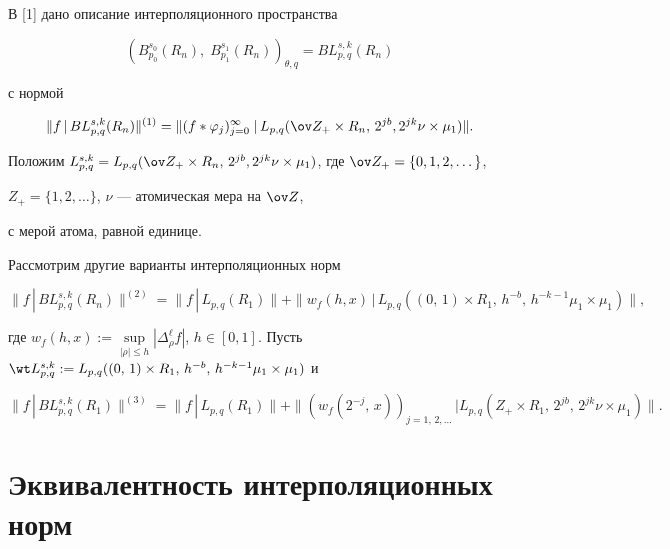 В [1] дано описание интерполяционного пространства


$$


(B^{s_0}_{p_0}(R_n),\; B^{s_1}_{p_1}(R_n))_{\theta, q} =


BL^{s,k}_{p,q}(R_n)


$$


с нормой


$$


\|f\,|\,BL^{s,k}_{p,q}(R_n)\|^{(1)} = \|(f*\varphi_j)^{\infty


}_{j=0} \;|\,L_{p,q}(\ov Z_+\times R_n,\, 2^{jb}, 2^{jk}\nu \times


\mu_1) \|.


$$


Положим $L^{s,k}_{p,q} = L_{p,q}(\ov Z_+\times R_n,\, 2^{jb},


2^{jk}\nu \times \mu_1)$, где $\ov Z_+ =\{0,1,2,\dotsc \}$,


$Z_+ =\{ 1,2,\dotsc \}$, $\nu$ --- атомическая мера на $\ov Z$,


с мерой атома, равной единице.





Рассмотрим другие варианты интерполяционных норм


$$


\|f\,|\,BL^{s,k}_{p,q}(R_n)\|^{(2)}


= \|f\,|\,L_{p,q}(R_1)\|+


\|w_f(h,x)\, |\, L_{p,q} ((0,\,1)


\times R_1,\, h^{-b},\,h^{-k-1}\mu_1\times \mu_1 )\|,


$$


где $w_f(h,x) :=\sup\limits_{|\rho |\le h} |\Delta^{\ell }_{\rho}


f|$, $h\in [0,1]$. Пусть $\wt L^{s,k}_{p,q} : = L_{p,q}


((0,\,1)\times R_1,\, h^{-b},\,h^{-k-1}\mu_1\times \mu_1)$ и


$$


\|f\,|\,BL^{s,k}_{p,q}(R_1


)\|^{(3)} = \|f\,|\,L_{p,q}(R_1)\|+


\|(w_f(2^{-j},\,x))_{j=1,\,2,\dots }\, | L_{p,q} (Z_+\times R_1,


\,2^{jb},\, 2^{jk}\nu\times \mu_1 )\|.


$$





\section{Эквивалентность интерполяционных норм}





